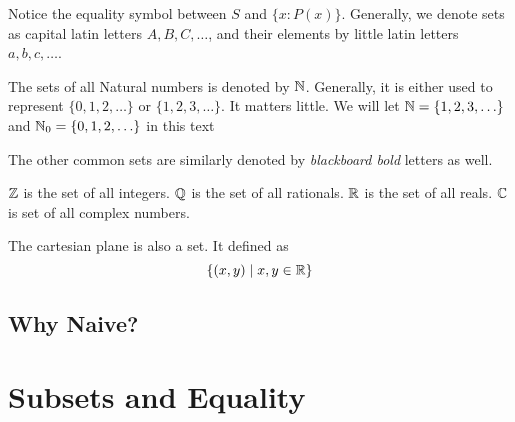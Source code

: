 \begin{remark}
    Notice the equality symbol between \(S\) and \( \{x : P(x)\} \). Generally, we denote sets
    as capital latin letters \(A, B, C, \ldots\), and their elements by little latin
    letters \(a, b, c, \ldots\).
\end{remark}

\begin{example}
    The sets of all Natural numbers is denoted by \(\mathbb N\). Generally, it is either used to 
    represent \( \{0, 1, 2, \ldots\} \) or \( \{1, 2, 3, \ldots\} \). It matters little.
    We will let \(\mathbb N = \{1, 2, 3, \ldots\}\) and \(\mathbb N_0 = \{0, 1, 2, \ldots\}\) in this text 
\end{example}

\begin{example}
    The other common sets are similarly denoted by \emph{blackboard bold} letters as well.
    \begin{enumerate}
        \ii \(\mathbb Z\) is the set of all integers.
        \ii \(\mathbb Q\) is the set of all rationals.
        \ii \(\mathbb R\) is the set of all reals.
        \ii \(\mathbb C\) is set of all complex numbers.
    \end{enumerate}
\end{example}


\begin{example}
    The cartesian plane is also a set. It defined as \[\{(x,y) \mid x, y \in \mathbb R\}\]
\end{example}


\subsection{Why Naive?}


\section{Subsets and Equality}